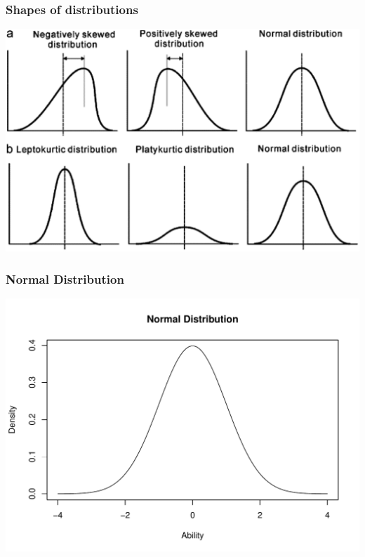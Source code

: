 \documentclass[dvipsnames]{beamer}\usepackage[]{graphicx}\usepackage[]{color}
\makeatletter
\def\maxwidth{ %
  \ifdim\Gin@nat@width>\linewidth
    \linewidth
  \else
    \Gin@nat@width
  \fi
}
\newenvironment{knitrout}{}{} %
\makeatother
\begin{document}
\begin{frame}
\frametitle{Shapes of distributions}
\begin{center}
\includegraphics[scale = .5]{images/distributions.png}
\end{center}
\end{frame}

\begin{frame}
\frametitle{Normal Distribution}
\begin{knitrout}
\color{fgcolor}

{\centering \includegraphics[width=\maxwidth]{figure/unnamed-chunk-9-1} 

}



\end{knitrout}
\end{frame}
\end{document}
